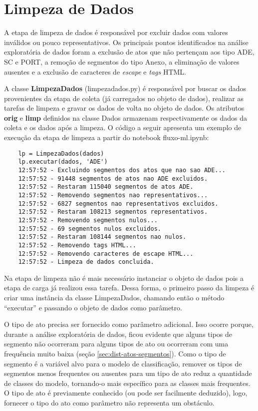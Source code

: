 \section{Limpeza de Dados}

A etapa de limpeza de dados é responsável por excluir dados com valores inválidos ou pouco representativos. Os principais pontos identificados na análise exploratória de dados foram a exclusão de atos que não pertençam aos tipo ADE, SC e PORT, a remoção de segmentos do tipo Anexo, a eliminação de valores ausentes e a exclusão de caracteres de \textit{escape} e \textit{tags} HTML.

A classe \textbf{LimpezaDados} (limpeza\textunderscore dados.py) é responsável por buscar os dados provenientes da etapa de coleta (já carregados no objeto de dados), realizar as tarefas de limpeza e gravar os dados de volta no objeto de dados. Os atributos \textbf{orig} e \textbf{limp} definidos na classe Dados armazenam  respectivamente os dados da coleta e os dados após a limpeza. O código a seguir apresenta um exemplo de execução da etapa de limpeza a partir do notebook fluxo-ml.ipynb:

\begin{lstlisting}
	lp = LimpezaDados(dados)
	lp.executar(dados, 'ADE')
	12:57:52 - Excluindo segmentos dos atos que nao sao ADE...
	12:57:52 - 91448 segmentos de atos nao ADE excluidos.
	12:57:52 - Restaram 115040 segmentos de atos ADE.
	12:57:52 - Removendo segmentos nao representativos...
	12:57:52 - 6827 segmentos nao representativos excluidos.
	12:57:52 - Restaram 108213 segmentos representativos.
	12:57:52 - Removendo segmentos nulos...
	12:57:52 - 69 segmentos nulos excluidos.
	12:57:52 - Restaram 108144 segmentos nao nulos.
	12:57:52 - Removendo tags HTML...
	12:57:52 - Removendo caracteres de escape HTML...
	12:57:52 - Limpeza de dados concluida.
\end{lstlisting}

Na etapa de limpeza não é mais necessário instanciar o objeto de dados pois a etapa de carga já realizou essa tarefa. Dessa forma, o primeiro passo da limpeza é criar uma instância da classe LimpezaDados, chamando então o método ``executar'' e passando o objeto de dados como parâmetro. 

O tipo de ato precisa ser fornecido como parâmetro adicional. Isso ocorre porque, durante a análise exploratória de dados, ficou evidente que alguns tipos de segmento não ocorreram para alguns tipos de ato ou ocorreram com uma frequência muito baixa (seção \ref{sec:dist-atos-segmentos}). Como o tipo de segmento é a variável alvo para o modelo de classificação, remover os tipos de segmentos menos frequentes ou ausentes para um tipo de ato reduz a quantidade de classes do modelo, tornando-o mais específico para as classes mais frequentes. O tipo de ato é previamente conhecido (ou pode ser facilmente deduzido), logo, fornecer o tipo do ato como parâmetro não representa um obstáculo. 

